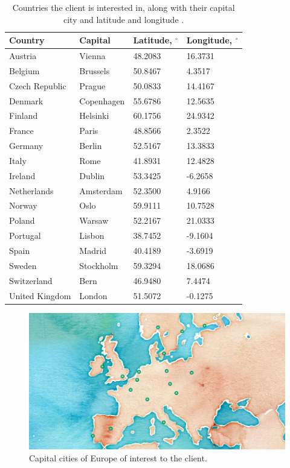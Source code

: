 \documentclass[12pt,a4paper]{article}
\begin{document}
\begin{table}[htbp!]
	\centering
	\caption{Countries the client is interested in, along with their capital city and latitude and longitude \cite{latlong}.}
	\label{tab:countriescapitals}
	\begin{tabular}{llll}
		\toprule
		\textbf{Country} 	& \textbf{Capital}  & \textbf{Latitude, $^{\circ}$} & \textbf{Longitude, $^{\circ}$} \\ \midrule
		Austria				& Vienna			& 48.2083			&	16.3731		\\
		Belgium 			& Brussels			& 50.8467			&	4.3517\\
		Czech Republic 		& Prague  			& 50.0833			&	14.4167\\
		Denmark 			& Copenhagen 		& 55.6786			&	12.5635\\
		Finland 			& Helsinki  		& 60.1756			&	24.9342\\
		France 				& Paris 			& 48.8566			&	2.3522\\
		Germany 			& Berlin 			& 52.5167			&	13.3833\\
		Italy 				& Rome 				& 41.8931			&	12.4828\\
		Ireland 			& Dublin    		& 53.3425			&	-6.2658\\
		Netherlands	 		& Amsterdam 		& 52.3500			&	4.9166\\
		Norway 				& Oslo 				& 59.9111			&	10.7528\\
		Poland 				& Warsaw   			& 52.2167			&	21.0333\\
		Portugal 			& Lisbon 			& 38.7452			&	-9.1604\\
		Spain 				& Madrid 			& 40.4189			&	-3.6919\\
		Sweden 				& Stockholm 		& 59.3294			&	18.0686\\
		Switzerland 		& Bern 				& 46.9480			&	7.4474\\
		United Kingdom 		& London 			& 51.5072			&	-0.1275\\ 
		\bottomrule
	\end{tabular}
\end{table}
\begin{figure}
	\includegraphics[width=\linewidth]{cities}
	\caption{Capital cities of Europe of interest to the client. }
	\label{fig:cities}
\end{figure}
\end{document}

